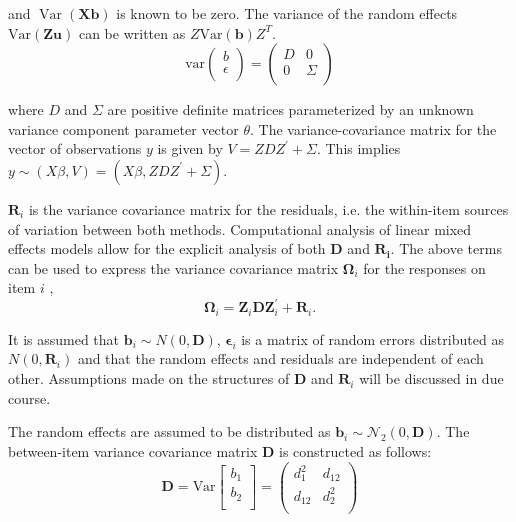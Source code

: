 \documentclass[12pt, a4paper]{report}
\theoremstyle{plain}
\theoremstyle{definition}
\theoremstyle{remark}
\begin{document}
		
		and $\operatorname{Var}(\textbf{Xb})$ is known to be zero. The variance of the
		random effects $\mbox{Var}(\textbf{Zu})$ can be written as
		$Z\mbox{Var}(\textbf{b})Z^{T}$.
		\[
		\mathrm{var}
		\left(
		\begin{array}{c}
		b \\
		\epsilon \\
		\end{array}
		\right)
		=
		\left(
		\begin{array}{cc}
		D & 0 \\
		0 & \Sigma \\
		\end{array}
		\right)
		\]
		
		
		
		
		where $D$ and $\Sigma$ are positive definite matrices parameterized by an unknown variance component parameter vector $ \theta.$ The variance-covariance matrix for the vector of observations $y$ is given by $V = ZDZ^{\prime}+ \Sigma.$ This implies $y \sim(X\beta, V) = (X\beta,ZDZ^{\prime}+ \Sigma)$. 
		
		$\boldsymbol{R}_{i}$ is the variance covariance matrix for the residuals, i.e. the within-item sources of variation between both methods. Computational analysis of linear mixed effects models allow for the explicit analysis of both $\boldsymbol{D}$ and $\boldsymbol{R_i}$.
		The above terms can be used to express the  variance covariance matrix $\boldsymbol{\Omega}_i$ for the responses on item $i$ ,
		\[
		\boldsymbol{\Omega}_i = \boldsymbol{Z}_i \boldsymbol{D} \boldsymbol{Z}_i^{\prime} + \boldsymbol{R}_i.
		\]
		
		It is assumed that $\boldsymbol{b}_i \sim N(0,\boldsymbol{D})$, $\boldsymbol{\epsilon}_i$ is a matrix of random errors distributed as $N(0,\boldsymbol{R}_i)$ and that the random effects and residuals are independent of each other. Assumptions made on the structures of $\boldsymbol{D}$ and $\boldsymbol{R}_i$ will be discussed in due course.
		
		The random effects are assumed to be distributed as $\boldsymbol{b}_i \sim \mathcal{N}_2(0,\boldsymbol{D})$. The between-item variance covariance matrix $\boldsymbol{D}$ is constructed as follows:
		\[ \boldsymbol{D} = \mbox{Var}  \left[
		\begin{array}{c}
		b_1   \\
		b_2  \\
		\end{array}
		\right] =  \left(
		\begin{array}{cc}
		d^2_1  & d_{12} \\
		d_{12} & d^2_2 \\
		\end{array}
		\right) \]
		
\end{document}
